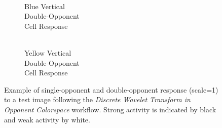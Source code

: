 \documentclass[journal,onecolumn]{IEEEtran}
\begin{document}
\begin{figure}[H]
\begin{subfigure}{0.15\textwidth}
        \caption{\\ Blue Vertical\\ Double-Opponent\\ Cell Response}
    \end{subfigure}
    \begin{subfigure}{0.15\textwidth}
        \centering
        \captionsetup{justification=centering}
        \caption{\\ Yellow Vertical\\ Double-Opponent\\ Cell Response}
    \end{subfigure}%
    \caption{Example of single-opponent and double-opponent response (scale=1) to a test image following the \textit{Discrete Wavelet Transform in Opponent Colorspace} workflow. Strong activity is indicated by black and weak activity by white.}
    \label{fig:transform-dwt}
\end{figure}
\end{document}
